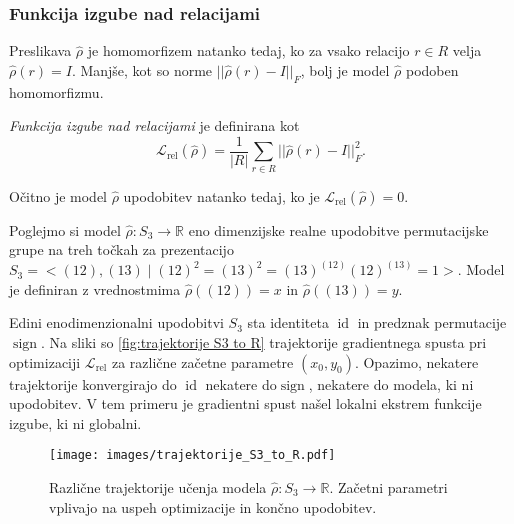 \documentclass[mat2, tisk]{fmfdelo}
\newcommand{\R}{\mathbb R}
\newcommand{\Loss}[1]{\mathcal L _\text{#1}}
\begin{document}
      \subsubsection{Funkcija izgube nad relacijami}
      \label{funckija izgube nad relacijami}
      Preslikava $\hat \rho$ je homomorfizem natanko tedaj, ko za
      vsako relacijo $r \in R$ velja
      $
      \hat \rho(r) = I
      $. Manjše, kot so norme $||\hat \rho(r) - I ||_F$, bolj je
      model $\hat\rho$ podoben homomorfizmu.
      \begin{definicija}
        \emph{Funkcija izgube nad relacijami} je definirana kot
        \begin{equation}
          \label{eq:funkcija izgube nad relacijami            }
          \Loss{rel}(\hat\rho) = \frac{1}{|R|} \sum \limits_{r \in R}
          ||\hat \rho(r) - I  ||_F^2.
        \end{equation}
      \end{definicija}
      Očitno je model $\hat \rho$ upodobitev natanko tedaj, ko je $
      \Loss{rel}(\hat\rho) =0$.
      \begin{primer}
        Poglejmo si model $\hat \rho \colon S_3 \to \R$ eno
        dimenzijske realne upodobitve permutacijske grupe na treh
        točkah za prezentacijo $S_3 = <(12), (13)\mid
        (12)^2=(13)^2=(13)^{(12)}(12)^{(13)}=1>$. Model je definiran
        z vrednostmima
        $\hat\rho((12)) = x$ in $\hat\rho((13)) = y$.

        Edini enodimenzionalni upodobitvi $S_3$ sta identiteta
        $\operatorname{id}$ in predznak permutacije
        $\operatorname{sign}$. Na sliki so  \ref{fig:trajektorije S3
        to R} trajektorije gradientnega spusta pri optimizaciji
        $\Loss{rel}$ za različne začetne parametre $(x_0, y_0)$.
        Opazimo, nekatere trajektorije konvergirajo  do
        $\operatorname{id}$ nekatere do$\operatorname{sign}$,
        nekatere do modela, ki ni upodobitev. V tem primeru je
        gradientni spust našel lokalni ekstrem funkcije izgube, ki ni globalni.
        \begin{figure}[h]
          \centering
          \texttt{[image: images/trajektorije\_S3\_to\_R.pdf]}
          \caption[Trajektorje učenja modela $S_3 \to \R$.]{Različne
            trajektorije učenja modela $\hat\rho \colon S_3 \to \R$.
            Začetni parametri vplivajo na uspeh optimizacije in končno
          upodobitev. }
          \label{fig:trajektorije S3 to R}
        \end{figure}
      \end{primer}
\end{document}
